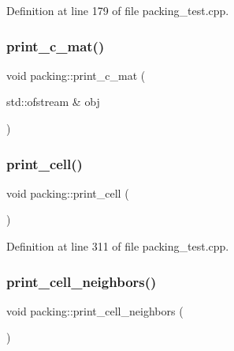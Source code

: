 Definition at line 179 of file packing\+\_\+test.\+cpp.

\mbox{\label{classpacking_ab6181af7330866576f5f6e5ad42446a3}} 
\subsubsection{\texorpdfstring{print\+\_\+c\+\_\+mat()}{print\_c\_mat()}\hspace{0.1cm}{\footnotesize\ttfamily [2/2]}}
{\footnotesize\ttfamily void packing\+::print\+\_\+c\+\_\+mat (\begin{DoxyParamCaption}\item[{std\+::ofstream \&}]{obj }\end{DoxyParamCaption})}

\mbox{\label{classpacking_af52187be2ba3d6cc25189c7cd389ba18}} 
\subsubsection{\texorpdfstring{print\+\_\+cell()}{print\_cell()}}
{\footnotesize\ttfamily void packing\+::print\+\_\+cell (\begin{DoxyParamCaption}{ }\end{DoxyParamCaption})}



Definition at line 311 of file packing\+\_\+test.\+cpp.

\mbox{\label{classpacking_a6f594a2ebfaaf03a8a43f31d5e170b86}} 
\subsubsection{\texorpdfstring{print\+\_\+cell\+\_\+neighbors()}{print\_cell\_neighbors()}}
{\footnotesize\ttfamily void packing\+::print\+\_\+cell\+\_\+neighbors (\begin{DoxyParamCaption}{ }\end{DoxyParamCaption})}



